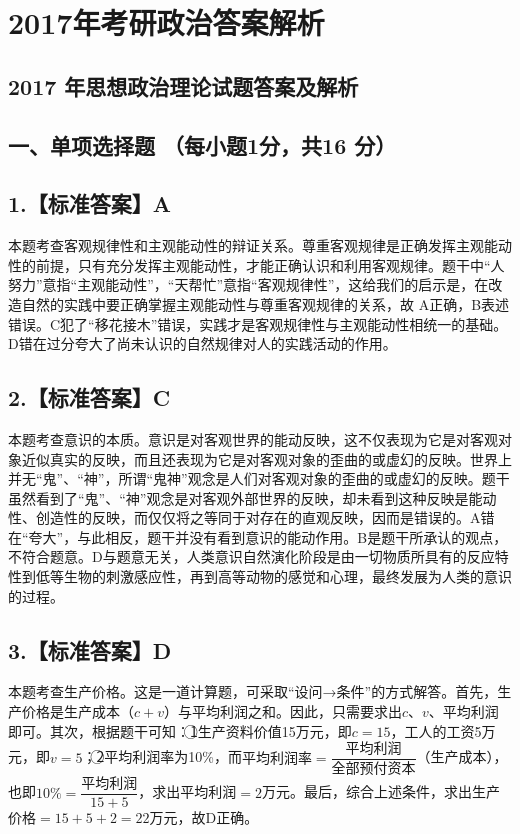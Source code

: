 \documentclass[UTF8,11pt]{ctexart}
\begin{document}
\section*{2017年考研政治答案解析}
\subsection*{2017 年思想政治理论试题答案及解析}

\subsection*{一、单项选择题 （每小题1分，共16 分）}

\subsection*{1.【标准答案】A}

本题考查客观规律性和主观能动性的辩证关系。尊重客观规律是正确发挥主观能动性的前提，只有充分发挥主观能动性，才能正确认识和利用客观规律。题干中“人努力”意指“主观能动性”，“天帮忙”意指“客观规律性”，这给我们的启示是，在改造自然的实践中要正确掌握主观能动性与尊重客观规律的关系，故 A正确，B表述错误。C犯了“移花接木”错误，实践才是客观规律性与主观能动性相统一的基础。D错在过分夸大了尚未认识的自然规律对人的实践活动的作用。


\subsection*{2.【标准答案】C}

本题考查意识的本质。意识是对客观世界的能动反映，这不仅表现为它是对客观对象近似真实的反映，而且还表现为它是对客观对象的歪曲的或虚幻的反映。世界上并无“鬼”、“神”，所谓“鬼神”观念是人们对客观对象的歪曲的或虚幻的反映。题干虽然看到了“鬼”、“神”观念是对客观外部世界的反映，却未看到这种反映是能动性、创造性的反映，而仅仅将之等同于对存在的直观反映，因而是错误的。A错在“夸大”，与此相反，题干并没有看到意识的能动作用。B是题干所承认的观点，不符合题意。D与题意无关，人类意识自然演化阶段是由一切物质所具有的反应特性到低等生物的刺激感应性，再到高等动物的感觉和心理，最终发展为人类的意识的过程。


\subsection*{3.【标准答案】D}

本题考查生产价格。这是一道计算题，可采取“设问→条件”的方式解答。首先，生产价格是生产成本（\(\displaystyle c+v\)）与平均利润之和。因此，只需要求出\(\displaystyle c\)、\(\displaystyle v\)、平均利润即可。其次，根据题干可知：\textcircled{1}生产资料价值15万元，即\(\displaystyle c=15\)，工人的工资5万元，即\(\displaystyle v=5\)；\textcircled{2}平均利润率为10\%，而\(\displaystyle \text{平均利润率}=\dfrac{\displaystyle \text{平均利润}}{\displaystyle \text{全部预付资本}}\)（生产成本），也即\(\displaystyle 10\%=\dfrac{\displaystyle \text{平均利润}}{\displaystyle 15+5}\)，求出平均利润\(\displaystyle =2\)万元。最后，综合上述条件，求出生产价格\(\displaystyle =15+5+2=22\)万元，故D正确。
\end{document}
